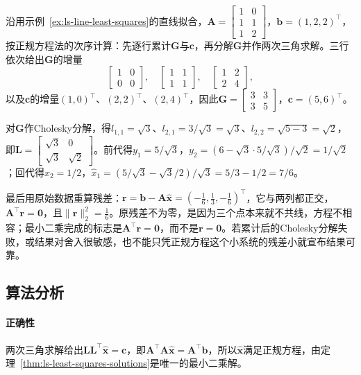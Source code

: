 \begin{example}[直线拟合的正规方程法]
\label{ex:ls-normal-equations-line-fit}
沿用示例~\ref{ex:ls-line-least-squares}的直线拟合，$\bm A=\left[\begin{smallmatrix}1&0\\1&1\\1&2\end{smallmatrix}\right]$，$\bm b=(1,2,2)^\top$，按正规方程法的次序计算：先逐行累计$\bm G$与$\bm c$，再分解$\bm G$并作两次三角求解。三行依次给出$\bm G$的增量
\[
 \begin{bmatrix}1&0\\0&0\end{bmatrix},\quad
 \begin{bmatrix}1&1\\1&1\end{bmatrix},\quad
 \begin{bmatrix}1&2\\2&4\end{bmatrix},
\]
以及$\bm c$的增量$(1,0)^\top$、$(2,2)^\top$、$(2,4)^\top$，因此$\bm G=\left[\begin{smallmatrix}3&3\\3&5\end{smallmatrix}\right]$，$\bm c=(5,6)^\top$。

对$\bm G$作Cholesky分解，得$l_{1,1}=\sqrt3$、$l_{2,1}=3/\sqrt3=\sqrt3$、$l_{2,2}=\sqrt{5-3}=\sqrt2$，即$\bm L=\left[\begin{smallmatrix}\sqrt3&0\\\sqrt3&\sqrt2\end{smallmatrix}\right]$。前代得$y_1=5/\sqrt3$，$y_2=(6-\sqrt3\cdot5/\sqrt3)/\sqrt2=1/\sqrt2$；回代得$\hat x_2=1/2$，$\hat x_1=(5/\sqrt3-\sqrt3/2)/\sqrt3=5/3-1/2=7/6$。

最后用原始数据重算残差：$\bm r=\bm b-\bm A\hat{\bm x}=(-\tfrac16,\tfrac13,-\tfrac16)^\top$，它与两列都正交，$\bm A^\top\bm r=\bm0$，且$\lVert\bm r\rVert_2^2=\tfrac16$。原残差不为零，是因为三个点本来就不共线，方程不相容；最小二乘完成的标志是$\bm A^\top\bm r=\bm0$，而不是$\bm r=\bm0$。若累计后的Cholesky分解失败，或结果对舍入很敏感，也不能只凭正规方程这个小系统的残差小就宣布结果可靠。
\end{example}

\subsection{算法分析}

\paragraph{正确性}
两次三角求解给出$\bm L\bm L^\top\hat{\bm x}=\bm c$，即$\bm A^\top\bm A\hat{\bm x}=\bm A^\top\bm b$，所以$\hat{\bm x}$满足正规方程，由定理~\ref{thm:ls-least-squares-solutions}是唯一的最小二乘解。

